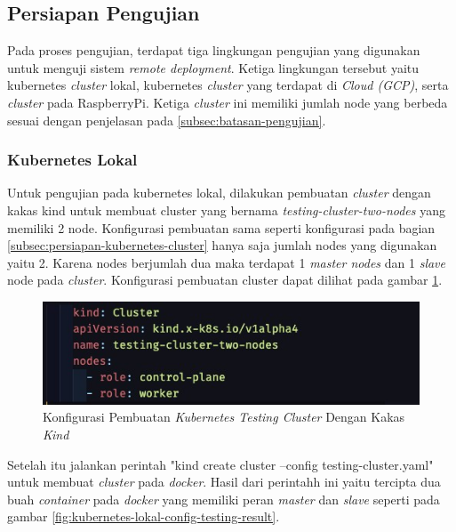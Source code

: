 \subsection{Persiapan Pengujian}
Pada proses pengujian, terdapat tiga lingkungan pengujian yang digunakan untuk menguji sistem \textit{remote deployment}. Ketiga lingkungan tersebut yaitu kubernetes \textit{cluster} lokal, kubernetes \textit{cluster} yang terdapat di \textit{Cloud (GCP)}, serta \textit{cluster} pada RaspberryPi. Ketiga \textit{cluster} ini memiliki jumlah node yang berbeda sesuai dengan penjelasan pada \ref{subsec:batasan-pengujian}.

\subsubsection{Kubernetes Lokal}
Untuk pengujian pada kubernetes lokal, dilakukan pembuatan \textit{cluster} dengan kakas kind untuk membuat cluster yang bernama \textit{testing-cluster-two-nodes} yang memiliki 2 node. Konfigurasi pembuatan sama seperti konfigurasi pada bagian \ref{subsec:persiapan-kubernetes-cluster} hanya saja jumlah nodes yang digunakan yaitu 2.
Karena nodes berjumlah dua maka terdapat 1 \textit{master nodes} dan 1 \textit{slave} node pada \textit{cluster}. Konfigurasi pembuatan cluster dapat dilihat pada gambar \ref{fig:kubernetes-lokal-config-testing}.

\begin{figure}[ht]
  \centering
  \includegraphics[width=1\textwidth]{resources/chapter-4/pengujian/kubernetes-lokal-config.jpg}
  \caption{Konfigurasi Pembuatan \textit{Kubernetes Testing Cluster} Dengan Kakas \textit{Kind}}
  \label{fig:kubernetes-lokal-config-testing}
\end{figure}

Setelah itu jalankan perintah "kind create cluster --config testing-cluster.yaml" untuk membuat \textit{cluster} pada \textit{docker}. Hasil dari perintahh ini yaitu tercipta dua buah \textit{container} pada \textit{docker} yang memiliki peran \textit{master} dan \textit{slave} seperti pada gambar \ref{fig:kubernetes-lokal-config-testing-result}.

